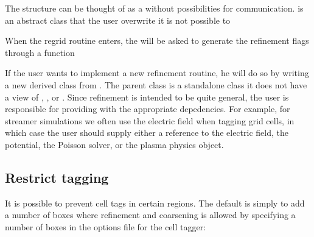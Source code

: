 \documentclass[letterpaper,10pt,english]{sphinxmanual}
\begin{document}
\begin{sphinxVerbatim}[commandchars=\\\{\},formatcom=\scriptsize]
    
\end{sphinxVerbatim}

The  structure can be thought of as a  without possibilities for communication.
 is an abstract class that the user  overwrite \sphinxhyphen{} it is not possible to

When the regrid routine enters, the  will be asked to generate the refinement flags through a function

\begin{sphinxVerbatim}[commandchars=\\\{\},formatcom=\scriptsize]
    
\end{sphinxVerbatim}

If the user wants to implement a new refinement routine, he will do so by writing a new derived class from .
The  parent class is a stand\sphinxhyphen{}alone class \sphinxhyphen{} it does not have a view of , , or .
Since refinement is intended to be quite general, the user is responsible for providing  with the appropriate depedencies.
For example, for streamer simulations we often use the electric field when tagging grid cells, in which case the user should supply either a reference to the electric field, the potential, the Poisson solver, or the plasma physics object.


\subsection{Restrict tagging}
\label{\detokenize{CellTagger:restrict-tagging}}
It is possible to prevent cell tags in certain regions.
The default is simply to add a number of boxes where refinement and coarsening is allowed by specifying a number of boxes in the options file for the cell tagger:
\end{document}
